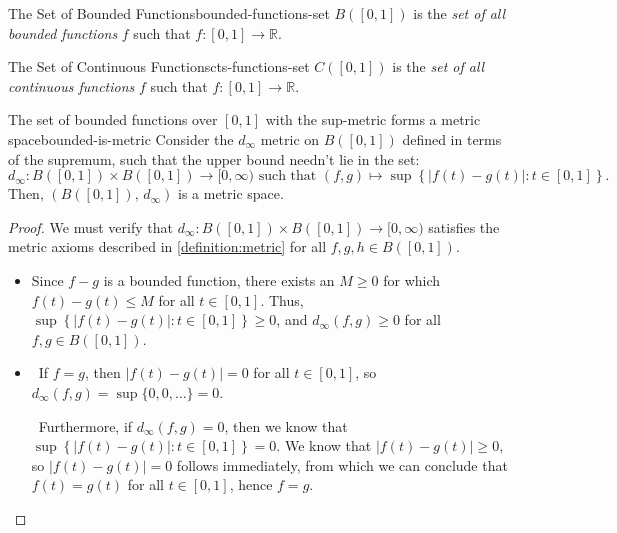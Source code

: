 \documentclass{article}
\newcommand*\iffforward{\par\boxed\Longrightarrow\ }
\newcommand*\iffbackward{\par\boxed\Longleftarrow\ }
\numberwithin{equation}{section}
\numberwithin{figure}{section}
\begin{document}
\begin{definition}{The Set of Bounded Functions}{bounded-functions-set}
    $ B([0,1]) $ is the \emph{set of all bounded functions} $ f $ such that
    $ f \colon [0, 1] \to \mathbb{R} $.
\end{definition}
\begin{definition}{The Set of Continuous Functions}{cts-functions-set}
    $ C([0,1]) $ is the \emph{set of all continuous functions} $ f $ such that
    $ f \colon [0, 1] \to \mathbb{R} $.
\end{definition}
\begin{theorem}{The set of bounded functions\texorpdfstring{ over $[0, 1]$}{}
    with the sup-metric forms a metric space}{bounded-is-metric}
    Consider the $ d_\infty $ metric on $ B([0, 1]) $ defined in terms of the
    supremum, such that the upper bound needn't lie in the set:
    \begin{equation}
        d_\infty \colon B([0, 1]) \times B([0, 1]) \to [0, \infty)
            \text{ such that } (f, g) \mapsto \sup\left\{\left\vert f(t) - g(t)
            \right\vert \colon t \in [0, 1] \right\}.
    \end{equation}
    Then, $ \left(B([0, 1]),\, d_\infty\right) $ is a metric space.
    \begin{proof}
        We must verify that $ d_\infty : B([0, 1]) \times B([0, 1]) \to [0,
        \infty) $ satisfies the metric axioms described in
        \cref{definition:metric} for all $ f, g, h \in B([0, 1]) $.
        \begin{itemize}
            \item Since $ f-g $ is a bounded function, there exists an $ M \geq
                0 $ for which $ f(t) - g(t) \leq M $ for all $ t \in [0, 1] $.
                Thus, $ \sup\left\{\left\vert f(t) - g(t) \right\vert \colon t
                \in [0, 1]\right\} \geq 0 $, and $ d_\infty(f, g) \geq 0 $ for
                all $ f, g \in B([0, 1]) $.
            \item \iffforward If $ f = g $, then $ \vert f(t) - g(t) \vert = 0 $
                for all $ t \in [0, 1] $, so $ d_\infty(f, g) = \sup\{0, 0,
                \ldots\} = 0 $.

                \iffbackward Furthermore, if $ d_\infty(f, g) = 0 $, then we
                know that $ \sup\left\{ \left\vert f(t) - g(t) \right\vert
                \colon t \in [0, 1] \right\} = 0 $. We know that $ \vert f(t) -
                g(t) \vert \geq 0 $, so $ \vert f(t) - g(t) \vert = 0 $ follows
                immediately, from which we can conclude that $ f(t) = g(t) $ for
                all $ t \in [0, 1] $, hence $ f = g $.


\end{itemize}
\end{proof}
\end{theorem}
\end{document}
